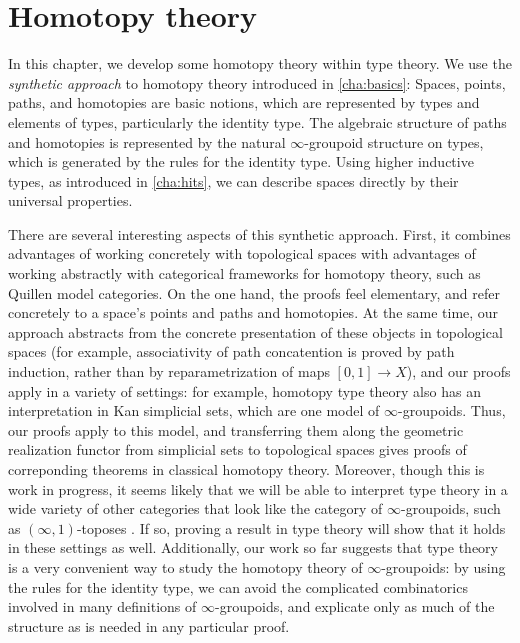 \chapter{Homotopy theory}
\label{cha:homotopy}


In this chapter, we develop some homotopy theory within type theory.  We
use the \emph{synthetic approach} to homotopy theory introduced in
\cref{cha:basics}: Spaces, points, paths, and homotopies are basic
notions, which are represented by types and elements of types, particularly
the identity type.  The algebraic structure of paths and homotopies is
represented by the natural $\infty$-groupoid
%
structure on types, which is generated
by the rules for the identity type.  Using higher inductive types, as
introduced in \cref{cha:hits}, we can describe spaces directly by their
universal properties.  

There are several interesting aspects of this synthetic approach.
First, it combines advantages of working concretely with topological
spaces with advantages of working abstractly with categorical frameworks
for homotopy theory, such as Quillen model categories.  On the one hand,
the proofs feel elementary, and refer concretely to a space's
points and paths and homotopies.  At the same time, our approach abstracts from
the concrete presentation of these objects in topological spaces
%
(for example,
associativity of path concatention is proved by path induction, rather
than by reparametrization of maps $[0,1] \to X$), and our proofs apply
in a variety of settings: for example, homotopy type theory also has an interpretation in
Kan simplicial sets, which are one model of $\infty$-groupoids.  Thus,
our proofs apply to this model, and transferring them along the geometric
realization functor from simplicial sets to topological spaces gives
proofs of  correponding theorems in classical homotopy theory.
Moreover, though this is work in progress, it seems likely that we will
be able to interpret type theory in a wide variety of other categories
that look like the category of $\infty$-groupoids, such as
$(\infty,1)$-toposes
.%
If so, proving a result in type theory will show
that it holds in these settings as well.  Additionally, our work so far
suggests that type theory is a very convenient way to study the homotopy theory
of $\infty$-groupoids: by using the rules for the identity type, we
can avoid the complicated combinatorics involved in many definitions of
$\infty$-groupoids, and explicate only as much of the
structure as is needed in any particular proof.  

